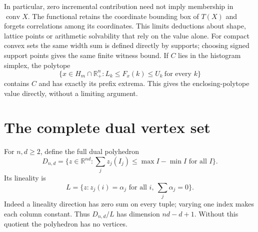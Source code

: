 \documentclass[11pt]{article}
\theoremstyle{definition}\newtheorem{definition}[theorem]{Definition}
\newcommand{\R}{\mathbb R}
\newcommand{\1}{\mathbf 1}
\newcommand{\conv}{\operatorname{conv}}
\begin{document}
In particular, zero incremental contribution need not imply membership in
$\conv X$. The functional retains the coordinate bounding box of $T(X)$ and
forgets correlations among its coordinates. This limits deductions about shape,
lattice points or arithmetic solvability that rely on the value alone.
For compact convex sets the same width sum is defined directly by supports;
choosing signed support points gives the same finite witness bound. If $C$ lies
in the histogram simplex, the polytope
\[
 \{x\in H_m\cap\R_+^n:L_k\le F_x(k)\le U_k\ \text{for every }k\}
\]
contains $C$ and has exactly its prefix extrema. This gives the enclosing-polytope
value directly, without a limiting argument.

\section{The complete dual vertex set}
For $n,d\ge2$, define the full dual polyhedron
\[
 D_{n,d}=\{z\in\R^{nd}:\textstyle\sum_j z_j(I_j)\le\max I-\min I\text{ for all }I\}.
\]
Its lineality is
\[
 L=\{z:z_j(i)=\alpha_j\text{ for all }i,\ \textstyle\sum_j\alpha_j=0\}.
\]
Indeed a lineality direction has zero sum on every tuple; varying one index
makes each column constant. Thus $D_{n,d}/L$ has dimension $nd-d+1$.
Without this quotient the polyhedron has no vertices.
\end{document}
